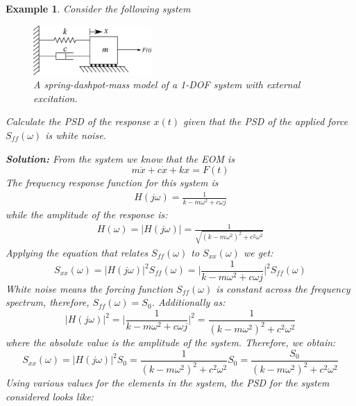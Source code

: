 \documentclass[12pt,letter]{article}
\newtheorem{ex}{Example}
\numberwithin{ex}{section} %
\newenvironment{example}{\begin{mdframed}[middlelinewidth=0.5mm]\begin{ex}\normalfont}{\end{ex}\end{mdframed}}
\numberwithin{re}{section} %
\begin{document}
\begin{example}
	Consider the following system
	\begin{figure}[H]
		\centering
		\includegraphics[width=0.4\textwidth]{../figures/forced_spring_mass_damper_system.png}
		\caption{A spring-dashpot-mass model of a 1-DOF system with external excitation.}
	\end{figure}
	Calculate the PSD of the response $x(t)$ given that the PSD of the applied force $S_{ff}(\omega)$ is white noise. 
	
	\noindent\textbf{Solution:} From the system we know that the EOM is 
	\begin{equation}
	m\ddot{x} +c\dot{x} + kx = F(t)
	\end{equation} 
	The frequency response function for this system is 
	\begin{eqnarray}
		H(j\omega) = \frac{1}{k-m\omega^2+c\omega j}
	\end{eqnarray}
	while the amplitude of the response is:
	\begin{eqnarray}
	H(\omega) = |H(j\omega)| = \frac{1}{\sqrt{(k-m\omega^2)^2+c^2\omega^2}}
	\end{eqnarray}
	Applying the equation that relates $S_{ff}(\omega)$ to $S_{xx}(\omega)$ we get:
	\begin{equation}
	S_{xx}(\omega) =  |H(j\omega)|^2 S_{ff}(\omega) = \bigg|\frac{1}{k-m\omega^2+c\omega j} \bigg|^2 S_{ff}(\omega) 
	\end{equation}
	White noise means the forcing function $S_{ff}(\omega)$ is constant across the frequency spectrum, therefore, $S_{ff}(\omega)=S_0$. Additionally as:
	\begin{equation}
	|H(j\omega)|^2 = \bigg|\frac{1}{k-m\omega^2+c\omega j} \bigg|^2 = \frac{1}{(k-m\omega^2)^2+c^2\omega^2}
	\end{equation}
	where the absolute value is the amplitude of the system. Therefore, we obtain:
	\begin{equation}
	S_{xx}(\omega) =  |H(j\omega)|^2 S_{0}= \frac{1}{(k-m\omega^2)^2+c^2\omega^2}S_0 = \frac{S_0}{(k-m\omega^2)^2+c^2\omega^2}
	\end{equation}
	Using various values for the elements in the system, the PSD for the system considered looks like:
	\begin{figure}[H]

\end{figure}
\end{example}
\end{document}
